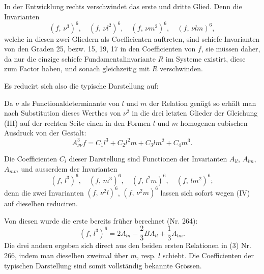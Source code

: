 In der Entwicklung rechts verschwindet das erste und dritte Glied. Denn die Invarianten
\[
(f,\,\nu^3)^6,\quad (f,\,\nu l^2)^6,\quad (f,\,\nu m^2)^6,\quad (f,\,\nu lm)^6,
\]
welche in diesen zwei Gliedern als Coefficienten auftreten, sind schiefe Invarianten von den Graden 25, bezw. 15, 19, 17 in den Coefficienten von $f$, sie müssen daher, da nur die einzige schiefe Fundamentalinvariante $R$ im Systeme existirt, diese zum Factor haben, und sonach gleichzeitig mit $R$ verschwinden.

Es reducirt sich also die typische Darstellung auf:

Da $\nu$ als Functionaldeterminante von $l$ und $m$ der Relation genügt
so erhält man nach Substitution dieses Werthes von $\nu^2$ in die drei letzten Glieder der Gleichung (III) auf der rechten Seite einen in den Formen $l$ und $m$ homogenen cubischen Ausdruck von der Gestalt:
\[
A_{\nu\nu}^3 f=C_1l^3+C_2l^2m+C_3lm^2+C_4m^3.
\]


Die Coefficienten $C_i$ dieser Darstellung sind Functionen der Invarianten $A_{ll}$, $A_{lm}$, $A_{mm}$ und ausserdem der Invarianten
\[
(f,\,l^3)^6,\quad (f,\,m^3)^6,\quad (f,\,l^2m)^6,\quad (f,\,lm^2)^6;
\]
denn die zwei Invarianten $(f,\,\nu^2l)^6$, $(f,\,\nu^2m)^6$ lassen sich sofort wegen (IV) auf dieselben reduciren.

Von diesen wurde die erste bereits früher berechnet (Nr. 264):
\[
(f,\,l^3)^6=2A_{ln}-\frac{2}{3}BA_{ll}+\frac{1}{3}A_{lm}.%
\]
Die drei andern ergeben sich direct aus den beiden ersten Relationen in (3) Nr. 266, indem man dieselben zweimal über $m$, resp. $l$ schiebt. Die Coefficienten der typischen Darstellung
sind somit vollständig bekannte Grössen.

